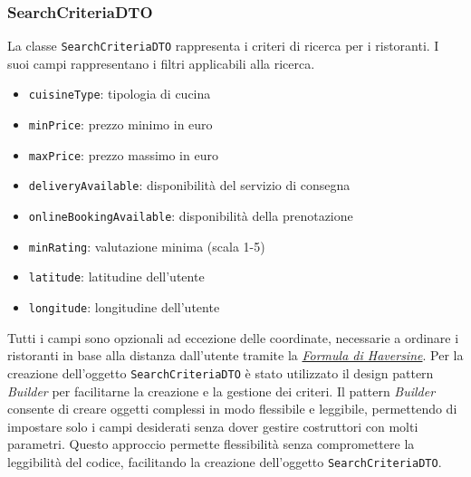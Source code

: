 \subsubsection{SearchCriteriaDTO}
\label{sec:searchcriteriadto}
La classe \texttt{SearchCriteriaDTO} rappresenta i criteri di 
ricerca per i ristoranti.
I suoi campi rappresentano i filtri applicabili alla ricerca.
\begin{itemize}
    \item \texttt{cuisineType}: tipologia di cucina
    \item \texttt{minPrice}: prezzo minimo in euro
    \item \texttt{maxPrice}: prezzo massimo in euro
    \item \texttt{deliveryAvailable}: disponibilità del servizio di consegna
    \item \texttt{onlineBookingAvailable}: disponibilità della prenotazione
    \item \texttt{minRating}: valutazione minima (scala 1-5)
    \item \texttt{latitude}: latitudine dell'utente
    \item \texttt{longitude}: longitudine dell'utente
\end{itemize}
Tutti i campi sono opzionali ad eccezione delle coordinate, 
necessarie a ordinare i ristoranti in base alla distanza
dall'utente tramite la 
\textit{\href{https://rosettacode.org/wiki/Haversine_formula}{Formula di Haversine}}.
Per la creazione dell'oggetto \texttt{SearchCriteriaDTO} è stato
utilizzato il design pattern \textit{Builder} per facilitarne la
creazione e la gestione dei criteri.
Il pattern \textit{Builder} consente di creare oggetti complessi
in modo flessibile e leggibile, permettendo di impostare solo i
campi desiderati senza dover gestire costruttori con molti 
parametri.
Questo approccio permette flessibilità senza compromettere la
leggibilità del codice, facilitando la creazione dell'oggetto
\texttt{SearchCriteriaDTO}.
